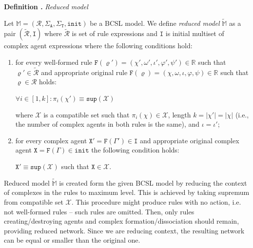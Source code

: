 \documentclass[12pt, twoside]{fithesis2} %
\newcounter{counter}[section]
\renewcommand{\thecounter}{\thesection.\arabic{counter}}
\newenvironment{definition}[1]{\bigskip\refstepcounter{counter}\noindent\textbf{Definition \thecounter } \emph{#1} \par\nopagebreak \begin{itshape}}{\end{itshape}\bigskip}
\begin{document}
\begin{definition}{Reduced model}
\label{reduced_model}
Let $\mathds{M} = (\mathcal{R}, \Sigma_\mathtt{A}, \Sigma_\mathtt{T}, \mathtt{init})$ be a BCSL model. We define \emph{reduced model} $\widetilde{\mathds{M}}$ as a pair $(\widetilde{\mathcal{R}}, \mathtt{I})$ where $\widetilde{\mathcal{R}}$ is set of rule expressions and $\mathtt{I}$ is initial multiset of complex agent expressions where the following conditions hold:

\begin{enumerate}
	\item for every well-formed rule $\mathtt{F}(\varrho') = (\chi', \omega', \iota', \varphi', \psi') \in \mathds{R}$ such that $\varrho' \in \widetilde{\mathcal{R}}$ and appropriate original rule $\mathtt{F}(\varrho) = (\chi, \omega, \iota, \varphi, \psi) \in \mathds{R}$ such that $\varrho \in \mathcal{R}$ holds:

	\begin{center}
	$\forall i \in [1, k]: \pi_i(\chi') \equiv \mathtt{sup}(\mathscr{X})$
	\end{center}

	where $\mathscr{X}$ is a compatible set such that $\pi_i(\chi) \in \mathscr{X}$, length $k = |\chi'| = |\chi|$ (i.e., the number of complex agents in both rules is the same), and $\iota = \iota'$;

	\item for every complex agent $\mathtt{X}' = \mathtt{F}(\Gamma') \in \mathtt{I}$ and appropriate original complex agent $\mathtt{X} = \mathtt{F}(\Gamma) \in \mathtt{init}$ the following condition holds:

	\begin{center}
	$ \mathtt{X}' \equiv \mathtt{sup}(\mathscr{X}) $ such that $\mathtt{X} \in \mathscr{X}$.
	\end{center}
\end{enumerate}
\end{definition}

Reduced model $\widetilde{\mathds{M}}$ is created form the given BCSL model by reducing the context of complexes in the rules to maximum level. This is achieved by taking supremum from compatible set $\mathscr{X}$. This procedure might produce rules with no action, i.e. not well-formed rules -- such rules are omitted. Then, only rules creating/destroying agents and complex formation/dissociation should remain, providing reduced network. Since we are reducing context, the resulting network can be equal or smaller than the original one.
\end{document}
